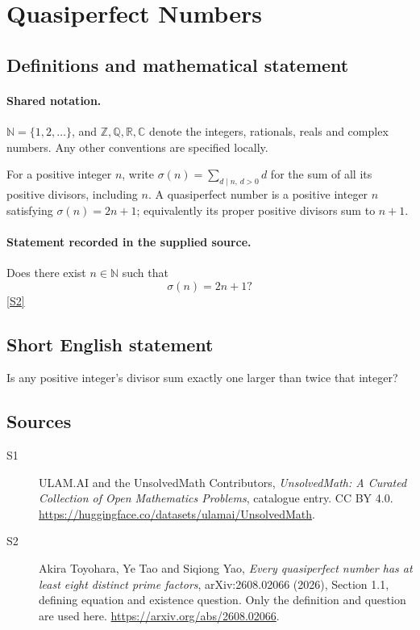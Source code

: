 \documentclass[11pt]{article}
\newcommand{\sref}[2]{\hyperlink{source:#1:#2}{[S#2]}}
\begin{document}
\section{Quasiperfect Numbers}\label{statement}

\subsection{Definitions and mathematical statement}

\paragraph{Shared notation.}$\mathbb N=\{1,2,\ldots\}$, and $\mathbb Z,\mathbb Q,\mathbb R,\mathbb C$ denote the integers, rationals, reals and complex numbers. Any other conventions are specified locally.


For a positive integer \(n\), write
\(\sigma(n)=\sum_{d\mid n,\,d>0}d\) for the sum of all its positive
divisors, including \(n\). A quasiperfect number is a positive integer
\(n\) satisfying \(\sigma(n)=2n+1\); equivalently its proper positive
divisors sum to \(n+1\).
\paragraph{Statement recorded in the supplied source.}
Does there exist \(n\in\mathbb N\) such that
\[
                             \sigma(n)=2n+1?
\] \sref{statement}{2}
\subsection{Short English statement}
Is any positive integer's divisor sum exactly one larger than twice that integer?
\subsection{Sources}
\begin{description}
\item[\hypertarget{source:statement:1}{S1}] ULAM.AI and the UnsolvedMath Contributors, \emph{UnsolvedMath: A Curated Collection of Open Mathematics Problems}, catalogue entry. CC BY 4.0. \url{https://huggingface.co/datasets/ulamai/UnsolvedMath}.
\item[\hypertarget{source:statement:2}{S2}] Akira Toyohara, Ye Tao and Siqiong Yao, \emph{Every quasiperfect number has at least eight distinct prime factors}, arXiv:2608.02066 (2026), Section 1.1, defining equation and existence question. Only the definition and question are used here. \url{https://arxiv.org/abs/2608.02066}.
\end{description}
\label{end:statement}
\end{document}
